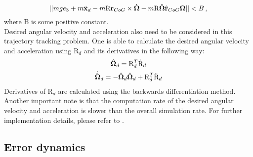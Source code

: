 \begin{equation}
	|| mge_3 + m\ddot{\textbf{x}}_d 
	- m\text{R}\textbf{r}_{CoG}  \times \dot{\boldsymbol{\Omega}} - m\text{R}\hat{\boldsymbol{\Omega}}\hat{\textbf{r}}_{CoG}\boldsymbol{\Omega}|| < B \, , \label{condition2}
\end{equation}
where B is some positive constant. \\
\indent Desired angular velocity and acceleration also need to be considered in this trajectory tracking problem. One is able to calculate the desired angular velocity and acceleration using $\text{R}_d$ and its derivatives in the following way:
\begin{gather}
	\hat{\boldsymbol{\Omega}}_d = \text{R}_d^T \dot{\text{R}}_d \label{eqn:omega_d}\\
	\dot{\hat{\boldsymbol{\Omega}}}_d = - \hat{\boldsymbol{\Omega}}_d\hat{\boldsymbol{\Omega}}_d + \text{R}_d^T \ddot{\text{R}}_d \label{eqn:alpha_d}
\end{gather}
Derivatives of $\text{R}_d$ are calculated using the backwards differentiation method. Another important note is that the computation rate of the desired angular velocity and acceleration is slower than the overall simulation rate. For further implementation details, please refer to \cite{gitLink}.

\subsection{Error dynamics} \label{ssec:error_dynamics}

